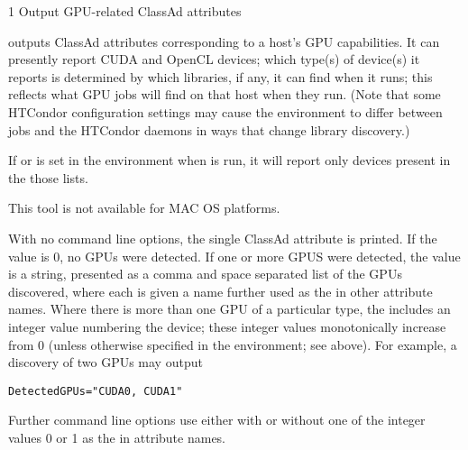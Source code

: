 \begin{ManPage}{\label{man-condor-gpu-discovery}}{1}
{Output GPU-related ClassAd attributes}

\Synopsis {}


\Description

 outputs ClassAd attributes corresponding to a
host's GPU capabilities.  It can presently report CUDA and OpenCL
devices; which type(s) of device(s) it reports is determined by which
libraries, if any, it can find when it runs; this reflects what GPU jobs
will find on that host when they run.  (Note that some HTCondor
configuration settings may cause the environment to differ between jobs
and the HTCondor daemons in ways that change library discovery.)

If  or  is set
in the environment when  is run, it will report
only devices present in the those lists.

This tool is not available for MAC OS platforms.

With no command line options, the single ClassAd attribute
 is printed.
If the value is 0, no GPUs were detected.
If one or more GPUS were detected, the value is
a string, presented as a comma and space separated list of the GPUs discovered,
where each is given a name further used as the  in other
attribute names.
Where there is more than one GPU of a particular type,
the  includes an integer value numbering the device;
these integer values monotonically increase from 0 (unless otherwise
specified in the environment; see above).
For example, a discovery of two GPUs may output
\begin{verbatim}
DetectedGPUs="CUDA0, CUDA1"
\end{verbatim}
Further command line options use  either with or without one of
the integer values 0 or 1 as the  in
attribute names.


\end{ManPage}
